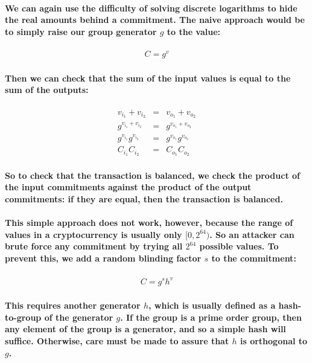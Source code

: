 \documentclass{article}
\begin{document}
\paragraph{We can again use the difficulty of solving discrete logarithms to hide the real amounts behind a commitment.  The naive approach would be to simply raise our group generator $g$ to the value:}

\begin{eqnarray}
  C=g^v
\end{eqnarray}

\paragraph{Then we can check that the sum of the input values is equal to the sum of the outputs:}

\begin{eqnarray}
  v_{i_1} + v_{i_2} &=& v_{o_1} + v_{o_2}\\
  g^{v_{i_1} + v_{i_2}} &=& g^{v_{o_1} + v_{o_2}}\\
  g^{v_{i_1}} g^{v_{i_2}} &=& g^{v_{o_1}} g^{v_{o_2}}\\
  C_{i_1} C_{i_2} &=& C_{o_1} C_{o_2}
\end{eqnarray}
  
\paragraph{So to check that the transaction is balanced, we check the product of the input commitments against the product of the output commitments: if they are equal, then the transaction is balanced.}

\paragraph{This simple approach does not work, however, because the range of values in a cryptocurrency is usually only $[0, 2^{64})$.  So an attacker can brute force any commitment by trying all $2^{64}$ possible values.  To prevent this, we add a random blinding factor $s$ to the commitment:}

\begin{eqnarray}
  C = g^s h^v
\end{eqnarray}
  
\paragraph{This requires another generator $h$, which is usually defined as a hash-to-group of the generator $g$.  If the group is a prime order group, then any element of the group is a generator, and so a simple hash will suffice.  Otherwise, care must be made to assure that $h$ is orthogonal to $g$.}
\end{document}
